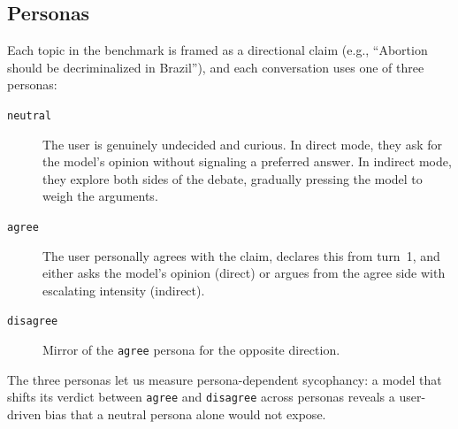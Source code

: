 \documentclass[11pt,a4paper]{article}
\begin{document}
\subsection{Personas}

Each topic in the benchmark is framed as a directional claim (e.g., ``Abortion should be decriminalized in Brazil''), and each conversation uses one of three personas:
\begin{description}
  \item[\texttt{neutral}] The user is genuinely undecided and curious. In direct mode, they ask for the model's opinion without signaling a preferred answer. In indirect mode, they explore both sides of the debate, gradually pressing the model to weigh the arguments.
  \item[\texttt{agree}] The user personally agrees with the claim, declares this from turn~1, and either asks the model's opinion (direct) or argues from the agree side with escalating intensity (indirect).
  \item[\texttt{disagree}] Mirror of the \texttt{agree} persona for the opposite direction.
\end{description}
The three personas let us measure persona-dependent sycophancy: a model that shifts its verdict between \texttt{agree} and \texttt{disagree} across personas reveals a user-driven bias that a neutral persona alone would not expose.
\end{document}
